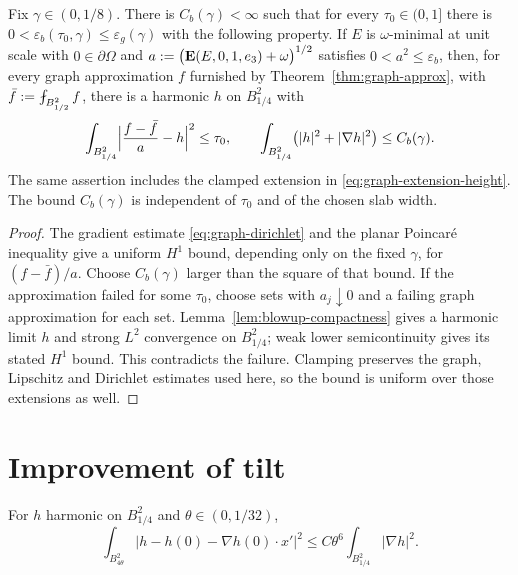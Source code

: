 \begin{lemma}\label{lem:harmonic-approx-uniform}
Fix $\gamma\in(0,1/8)$.  There is $C_b(\gamma)<\infty$ such that for every
$\tau_0\in(0,1]$ there is
$0<\varepsilon_b(\tau_0,\gamma)\le\varepsilon_g(\gamma)$ with the following
property.  If $E$ is $\omega$-minimal at unit scale with
$0\in\partial\Omega$ and
$a:=\bigl(\operatorname{\mathbf E}(E,0,1,e_3)+\omega\bigr)^{1/2}$ satisfies
$0<a^2\le\varepsilon_b$, then, for every graph approximation $f$ furnished
by Theorem~\ref{thm:graph-approx}, with
$\bar f:=\avg_{B^2_{1/2}}f$, there is a harmonic $h$ on $B^2_{1/4}$ with
\begin{equation}\label{eq:harmonic-approx}
  \int_{B^2_{1/4}}\Bigl|\frac{f-\bar f}{a}-h\Bigr|^2\le\tau_0,
  \qquad
  \int_{B^2_{1/4}}\bigl(|h|^2+|\nabla h|^2\bigr)\le C_b(\gamma).
\end{equation}
The same assertion includes the clamped extension in
\eqref{eq:graph-extension-height}.  The bound $C_b(\gamma)$ is independent
of $\tau_0$ and of the chosen slab width.
\end{lemma}

\begin{proof}
The gradient estimate \eqref{eq:graph-dirichlet} and the planar
Poincar\'e inequality give a uniform $H^1$ bound, depending only on the
fixed $\gamma$, for $(f-\bar f)/a$.  Choose $C_b(\gamma)$ larger than the
square of that bound.  If the approximation failed for some $\tau_0$, choose
sets with $a_j\downarrow0$ and a failing graph approximation for each set.
Lemma~\ref{lem:blowup-compactness} gives a harmonic limit $h$ and strong
$L^2$ convergence on $B^2_{1/4}$; weak lower semicontinuity gives its stated
$H^1$ bound.  This contradicts the failure.  Clamping preserves the graph,
Lipschitz and Dirichlet estimates used here, so the bound is uniform over
those extensions as well.
\end{proof}

\section{Improvement of tilt}

\begin{lemma}\label{lem:harmonic-affine}
For $h$ harmonic on $B^2_{1/4}$ and $\theta\in(0,1/32)$,
\begin{equation}\label{eq:harmonic-affine}
  \int_{B^2_{4\theta}}\bigl|h-h(0)-\nabla h(0)\cdot x'\bigr|^2
  \le C\theta^6\int_{B^2_{1/4}}|\nabla h|^2 .
\end{equation}
\end{lemma}

